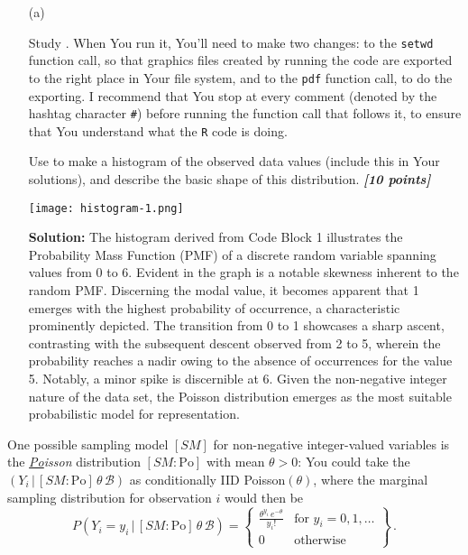 \documentclass[12pt]{article}
\newcommand{\given}{\, | \,}
\newcommand{\bi}[1]{\b{\i{#1}}}
\renewcommand{\b}[1]{\textbf{#1}}
\renewcommand{\i}[1]{\textit{#1}}
\renewcommand{\r}[1]{\text{#1}}
\renewcommand{\t}[1]{\texttt{#1}}
\renewcommand{\u}[1]{\underline{#1}}
\begin{document}
\begin{itemize}

\item[(a)]

Study \fbox{\t{Code Block 1}}. When You run it, You'll need to make two changes: to the \t{setwd} function call, so that graphics files created by running the code are exported to the right place in Your file system, and to the \t{pdf} function call, to do the exporting. I recommend that You stop at every comment (denoted by the hashtag character \t{\#}) before running the function call that follows it, to ensure that You understand what the \t{R} code is doing.

Use \fbox{\t{Code Block 1}} to make a histogram of the observed data values (include this in Your solutions), and describe the basic shape of this distribution. \bi{[10 points]}

\texttt{[image: histogram-1.png]}


{\color{blue} \textbf{Solution:}
The histogram derived from Code Block 1 illustrates the Probability Mass Function (PMF) of a discrete random variable spanning values from 0 to 6. Evident in the graph is a notable skewness inherent to the random PMF. Discerning the modal value, it becomes apparent that 1 emerges with the highest probability of occurrence, a characteristic prominently depicted. The transition from 0 to 1 showcases a sharp ascent, contrasting with the subsequent descent observed from 2 to 5, wherein the probability reaches a nadir owing to the absence of occurrences for the value 5. Notably, a minor spike is discernible at 6. Given the non-negative integer nature of the data set, the Poisson distribution emerges as the most suitable probabilistic model for representation.
}
\end{itemize}

One possible sampling model $[SM]$ for non-negative integer-valued variables is the \i{\u{Po}isson} distribution $[ SM \colon \! \r{Po} ]$ with mean $\theta > 0$: You could take the $( Y_i \given [ SM \colon \! \r{Po} ] \, \theta \, \mathcal{ B } )$ as conditionally IID Poisson$( \theta )$, where the marginal sampling distribution for observation $i$ would then be
\begin{equation} \label{e:poisson-1}
P ( Y_i = y_i \given [ SM \colon \! \r{Po} ] \, \theta \, \mathcal{ B } ) = \left\{ \begin{array}{cc} \frac{ \theta^{ y_i } \, e^{ - \theta } }{ y_i ! } & \textrm{for } y_i = 0, 1, \dots \\ 0 & \textrm{otherwise} \end{array} \right\} \, .
\end{equation}
\end{document}
